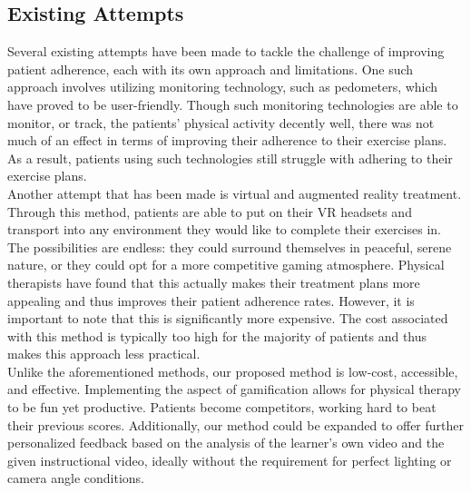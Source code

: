 \subsection{Existing Attempts}
\indent Several existing attempts have been made to tackle the challenge of improving patient adherence, 
each with its own approach and limitations. One such approach involves utilizing monitoring technology, 
such as pedometers, which have proved to be user-friendly. Though such monitoring technologies are 
able to monitor, or track, the patients' physical activity decently well, there was not much of an effect in terms 
of improving their adherence to their exercise plans. As a result, patients using such technologies still struggle with 
adhering to their exercise plans.
\\
\indent Another attempt that has been made is virtual and augmented reality treatment. Through this method, patients 
are able to put on their VR headsets and transport into any environment they would like to complete their exercises in. 
The possibilities are endless: they could surround themselves in peaceful, serene nature, or they could 
opt for a more competitive gaming atmosphere. Physical therapists have found that this actually 
makes their treatment plans more appealing and thus improves their patient adherence rates. However, 
it is important to note that this is significantly more expensive. The cost associated with this 
method is typically too high for the majority of patients and thus makes this approach less practical.
\\
\indent Unlike the aforementioned methods, our proposed method is low-cost, accessible, and effective. 
Implementing the aspect of gamification allows for physical therapy to be fun yet productive. Patients become 
competitors, working hard to beat their previous scores. Additionally, our method could be expanded to offer 
further personalized feedback based on the analysis of the learner's own video and the given instructional video, 
ideally without the requirement for perfect lighting or camera angle conditions.

